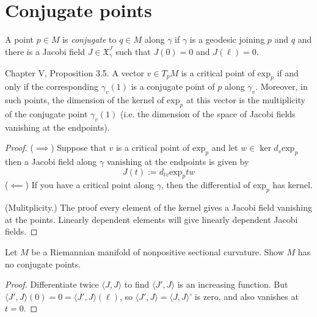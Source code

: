 \section{Conjugate points}
\label{section-conjugate-points}

\begin{definition}
\label{definition-conjugate-points}
A point $p \in M$ is {\it conjugate} to $q
\in M$ along $\gamma$ if $\gamma$ is
a geodesic joining $p$ and $q$ and there is a
Jacobi field
$J\in\mathfrak{X}_\gamma^J$ such that
$J(0)=0$ and  $J(\ell)=0$.
\end{definition}

\begin{proposition}
\label{proposition-critical-points-exp}
\cite{doc} Chapter V, Proposition 3.5. A
vector $v \in T_pM$ is a critical
point of $\text{exp}_p$ if and only if the
corresponding
$\gamma_v(1)$ is a conjugate point of $p$
along $\gamma_v$.
Moreover, in such points, the dimension of
the kernel of
$\text{exp}_p$ at this vector is the
multiplicity
of the conjugate point $\gamma_v(1)$
(i.e. the dimension of the space of Jacobi
fields vanishing
at the endpoints).
\end{proposition}

\begin{proof}
($\implies$) Suppose that $v$ is a critical
point of $\text{exp}_p$ and
let $w \in \ker d_v \text{exp}_p$ then a
Jacobi field along $\gamma$
vanishing at the endpoints is given by
$$
J(t):=d_{tv}\text{exp}_ptw
$$
($\impliedby$) If you have a critical point
along $\gamma$, then the
differential of $\text{exp}_p$ has kernel.

(Mulitplicity.) The proof every element of
the kernel gives a Jacobi
 field vanishing at the points. Linearly
 dependent elements will give
 linearly dependent Jacobi fields.
\end{proof}

\begin{exercise}
\label{exercise-jacobi-nonpositive-k}
\begin{reference}
\cite[Chapter V, Section 3, Exercise 3]{doc}
\end{reference}
Let $M$ be a Riemannian manifold
of nonpositive sectional curvature.
Show $M$ has no conjugate points.
\end{exercise}

\begin{proof}
Differentiate twice $\langle J,J\rangle$
to find $\langle J',J\rangle$ is an increasing function.
But $\langle J',J\rangle(0)=0=
\langle J',J\rangle(\ell)$,
so $\langle J',J\rangle
=\langle J,J\rangle$' is zero,
and also vanishes at $t=0$.
\end{proof}


